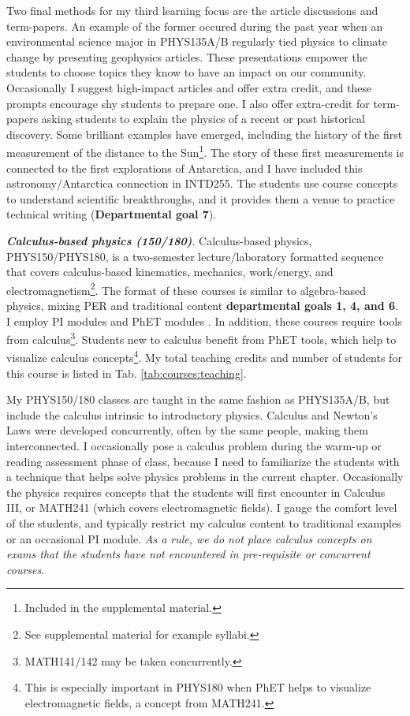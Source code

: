 \documentclass[../../../main.tex]{subfiles}
\begin{document}
Two final methods for my third learning focus are the article discussions and term-papers.  An example of the former occured during the past year when an environmental science major in PHYS135A/B regularly tied physics to climate change by presenting geophysics articles.  These presentations empower the students to choose topics they know to have an impact on our community.  Occasionally I suggest high-impact articles and offer extra credit, and these prompts encourage shy students to prepare one.  I also offer extra-credit for term-papers asking students to explain the physics of a recent or past historical discovery.  Some brilliant examples have emerged, including the history of the first measurement of the distance to the Sun\footnote{Included in the supplemental material.}.  The story of these first measurements is connected to the first explorations of Antarctica, and I have included this astronomy/Antarctica connection in INTD255.  The students use course concepts to understand scientific breakthroughs, and it provides them a venue to practice technical writing (\textbf{Departmental goal 7}).  \\ \hspace{0.1cm}

\textbf{\textit{Calculus-based physics (150/180)}}. Calculus-based physics, PHYS150/PHYS180, is a two-semester lecture/laboratory formatted sequence that covers calculus-based kinematics, mechanics, work/energy, and electromagnetism\footnote{See supplemental material for example syllabi.}.  The format of these courses is similar to algebra-based physics, mixing PER and traditional content \textbf{departmental goals 1, 4, and 6}.  I employ PI modules \cite{mazur2013peer} and PhET modules \cite{phet}.  In addition, these courses require tools from calculus\footnote{MATH141/142 may be taken concurrently.}.  Students new to calculus benefit from PhET tools, which help to visualize calculus concepts\footnote{This is especially important in PHYS180 when PhET helps to visualize electromagnetic fields, a concept from MATH241.}.  My total teaching credits and number of students for this course is listed in Tab. \ref{tab:courses:teaching}. \\ \hspace{0.1cm}

My PHYS150/180 classes are taught in the same fashion as PHYS135A/B, but include the calculus intrinsic to introductory physics.  Calculus and Newton's Laws were developed concurrently, often by the same people, making them interconnected.  I occasionally pose a calculus problem during the warm-up or reading assessment phase of class, because I need to familiarize the students with a technique that helps solve physics problems in the current chapter.  Occasionally the physics requires concepts that the students will first encounter in Calculus III, or MATH241 (which covers electromagnetic fields).  I gauge the comfort level of the students, and typically restrict my calculus content to traditional examples or an occasional PI module.  \textit{As a rule, we do not place calculus concepts on exams that the students have not encountered in pre-requisite or concurrent courses}.  \\ \hspace{0.1cm}
\end{document}
